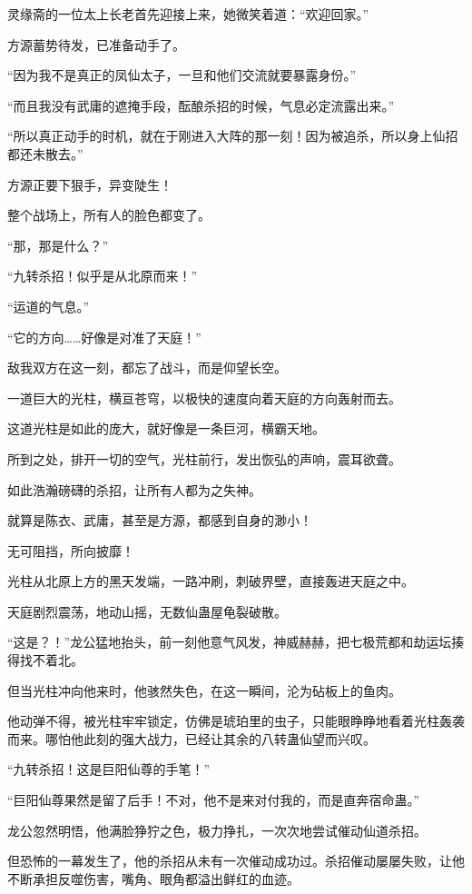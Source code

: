 \begin{this_body}
灵缘斋的一位太上长老首先迎接上来，她微笑着道：“欢迎回家。”

方源蓄势待发，已准备动手了。

“因为我不是真正的凤仙太子，一旦和他们交流就要暴露身份。”

“而且我没有武庸的遮掩手段，酝酿杀招的时候，气息必定流露出来。”

“所以真正动手的时机，就在于刚进入大阵的那一刻！因为被追杀，所以身上仙招都还未散去。”

方源正要下狠手，异变陡生！

整个战场上，所有人的脸色都变了。

“那，那是什么？”

“九转杀招！似乎是从北原而来！”

“运道的气息。”

“它的方向……好像是对准了天庭！”

敌我双方在这一刻，都忘了战斗，而是仰望长空。

一道巨大的光柱，横亘苍穹，以极快的速度向着天庭的方向轰射而去。

这道光柱是如此的庞大，就好像是一条巨河，横霸天地。

所到之处，排开一切的空气，光柱前行，发出恢弘的声响，震耳欲聋。

如此浩瀚磅礴的杀招，让所有人都为之失神。

就算是陈衣、武庸，甚至是方源，都感到自身的渺小！

无可阻挡，所向披靡！

光柱从北原上方的黑天发端，一路冲刷，刺破界壁，直接轰进天庭之中。

天庭剧烈震荡，地动山摇，无数仙蛊屋龟裂破散。

“这是？！”龙公猛地抬头，前一刻他意气风发，神威赫赫，把七极荒都和劫运坛揍得找不着北。

但当光柱冲向他来时，他骇然失色，在这一瞬间，沦为砧板上的鱼肉。

他动弹不得，被光柱牢牢锁定，仿佛是琥珀里的虫子，只能眼睁睁地看着光柱轰袭而来。哪怕他此刻的强大战力，已经让其余的八转蛊仙望而兴叹。

“九转杀招！这是巨阳仙尊的手笔！”

“巨阳仙尊果然是留了后手！不对，他不是来对付我的，而是直奔宿命蛊。”

龙公忽然明悟，他满脸狰狞之色，极力挣扎，一次次地尝试催动仙道杀招。

但恐怖的一幕发生了，他的杀招从未有一次催动成功过。杀招催动屡屡失败，让他不断承担反噬伤害，嘴角、眼角都溢出鲜红的血迹。


\end{this_body}
